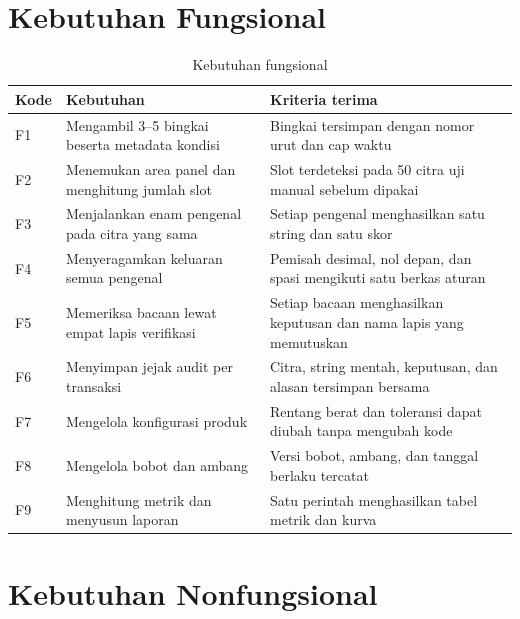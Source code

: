 \documentclass[12pt,a4paper,oneside]{report}
\begin{document}
\section{Kebutuhan Fungsional}

\begin{table}[H]
\caption{Kebutuhan fungsional}
\label{tab:fungsional}
\begin{tabularx}{\textwidth}{@{}L{1.1cm} L{5.3cm} X@{}}
\toprule
\textbf{Kode} & \textbf{Kebutuhan} & \textbf{Kriteria terima} \\
\midrule
F1 & Mengambil 3--5 bingkai beserta metadata kondisi & Bingkai tersimpan dengan nomor urut dan cap waktu \\
F2 & Menemukan area panel dan menghitung jumlah slot & Slot terdeteksi pada 50 citra uji manual sebelum dipakai \\
F3 & Menjalankan enam pengenal pada citra yang sama & Setiap pengenal menghasilkan satu string dan satu skor \\
F4 & Menyeragamkan keluaran semua pengenal & Pemisah desimal, nol depan, dan spasi mengikuti satu berkas aturan \\
F5 & Memeriksa bacaan lewat empat lapis verifikasi & Setiap bacaan menghasilkan keputusan dan nama lapis yang memutuskan \\
F6 & Menyimpan jejak audit per transaksi & Citra, string mentah, keputusan, dan alasan tersimpan bersama \\
F7 & Mengelola konfigurasi produk & Rentang berat dan toleransi dapat diubah tanpa mengubah kode \\
F8 & Mengelola bobot dan ambang & Versi bobot, ambang, dan tanggal berlaku tercatat \\
F9 & Menghitung metrik dan menyusun laporan & Satu perintah menghasilkan tabel metrik dan kurva \\
\bottomrule
\end{tabularx}
\end{table}

\section{Kebutuhan Nonfungsional}
\end{document}
